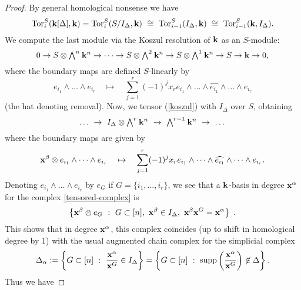 \documentclass{amsart}
\newcommand{\Tor}{\mathop{\rm Tor}\nolimits}
\newcommand{\supp}{\mathop{\rm supp}\nolimits}
\newcommand{\extpow}[1]{{\textstyle\bigwedge^{#1}\:}}
\newcommand{\fld}{{\bf k}}
\newcommand{\isom}{\cong}
\newcommand{\xx}{{\bf x}}
\begin{document}
\begin{proof} By general homological nonsense we have
	\begin{equation}
	\Tor^S_i(\fld[\Delta],\fld) =
        \Tor^S_i(S/I_\Delta,\fld) ~\isom~ 
        \Tor^S_{i-1}(I_\Delta,\fld) ~\isom~ 
	\Tor^S_{i-1}(\fld,I_\Delta).
	\end{equation}
We compute the last module via the Koszul resolution of $\fld$ as an $S$-module:
	\begin{equation} \label{koszul}
	0 \to S \otimes \extpow{n} \fld^n \to \dots \to S \otimes \extpow{2} \fld^n \to
	S \otimes \extpow{1} \fld^n \to S \to \fld \to 0,
	\end{equation}
where the boundary maps are defined $S$-linearly by
	\begin{equation}
	e_{i_1} \wedge \dots \wedge e_{i_r} \quad\mapsto\quad
	\sum_{j=1}^r (-1)^j x_r e_{i_1} \wedge \dots \wedge \widehat{e_{i_1}} \wedge \dots 
	\wedge e_{i_r}
	\end{equation}
(the hat denoting removal).  Now, we tensor (\ref{koszul}) with $I_\Delta$ over $S$, obtaining
	\begin{equation}
        \label{tensored-complex}
	\dots ~\to~ I_\Delta \otimes \extpow{r} \fld^n ~\to~ \extpow{r-1} \fld^n ~\to~ \dots
	\end{equation}
where the boundary maps are given by
	\begin{equation}
	\xx^\beta \otimes e_{i_1} \wedge \dots \wedge e_{i_r} \quad\mapsto\quad
	\sum_{j=1}^r (-1)^j x_r e_{i_1} \wedge \dots \wedge \widehat{e_{i_1}} \wedge \dots 
	\wedge e_{i_r}.
	\end{equation}
Denoting $e_{i_1} \wedge \dots \wedge e_{i_r}$ by $e_G$ if $G=\{i_1,\ldots,i_r\}$,
we see that a $\fld$-basis in degree $\xx^\alpha$ for the complex 
\eqref{tensored-complex} is
	\begin{equation}
	\left\{ \xx^\beta \otimes e_G ~:~ G \subset [n], ~  \xx^\beta \in I_\Delta, ~ \xx^\beta \xx^G = \xx^\alpha 
	\right\}~.
	\end{equation}
This shows that in degree $\xx^\alpha$, this complex coincides (up to shift
in homological degree by $1$) with the usual augmented chain complex for
the simplicial complex
	\begin{equation}
	\Delta_\alpha := \left\{ G \subset [n] ~:~ \frac{\xx^\alpha}{\xx^G} \in I_\Delta 
	\right\}
        = \left\{ G \subset [n] ~:~ \supp\left( \frac{\xx^\alpha}{\xx^G} \right) 
             \not\in \Delta 
	\right\}.
	\end{equation}
Thus we have 

\end{proof}
\end{document}
